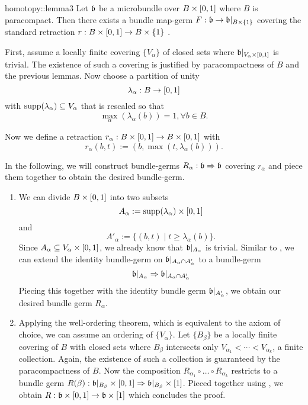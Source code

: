 \begin{scope}
\begin{mylemma}{homotopy::lemma3}
    Let $\bb$ be a microbundle over $B \times \I$ where $B$ is paracompact.
    Then there exists a bundle map-germ $F: \bb \to \bb\restr{B \times \{1\}}$
    covering the standard retraction $r: B \times \I \to B \times \{1\}$ .
\end{mylemma}
\begin{myproof}
    First, assume a locally finite covering $\{V_\alpha\}$ of closed sets where $\bb\restr{V_\alpha \times \I}$ is trivial.
    The existence of such a covering is justified by paracompactness of $B$ and the previous lemmas.
    Now choose a partition of unity
    \[ \lambda_\alpha: B \to \I \]
    with $\text{supp}(\lambda_\alpha) \sub V_\alpha$ that is rescaled so that
    \[ \max_{\alpha}(\lambda_\alpha(b)) = 1, \forall b \in B. \]
    
    Now we define a retraction $r_\alpha: B \times \I \to B \times \I$ with
    \[ r_\alpha(b, t) := (b, \max(t, \lambda_\alpha(b))). \]

    In the following, we will construct bundle-germs $R_\alpha: \bb \double \bb$ covering $r_\alpha$
    and piece them together to obtain the desired bundle-germ.
    \begin{enumerate}
        \item 
        We can divide $B \times \I$ into two subsets
        \[ A_\alpha := \text{supp}(\lambda_\alpha) \times \I \]
        and
        \[ A'_\alpha := \{(b, t) \mid t \ge \lambda_\alpha(b)\}. \]
        Since $A_\alpha \sub V_\alpha \times \I$, we already know that $\bb\restr{A_\alpha}$ is trivial.
        Similar to , we can extend the identity bundle-germ on $\bb\restr{\A \cap \A[']}$ to a bundle-germ
        \[ \bb\restr{\A} \double \bb\restr{\A \cap \A[']} \]
        Piecing this together with the identity bundle germ $\bb\restr{\A[']}$, we obtain our desired bundle germ $R_\alpha$.
        
        \item
        Applying the well-ordering theorem, which is equivalent to the axiom of choice, we can assume an ordering of $\{ V_\alpha \}$.
        Let $\{B_\beta\}$ be a locally finite covering of $B$ with closed sets where $B_\beta$ intersects only $V_{\alpha_1} < \cdots < V_{\alpha_k}$, a finite collection.
        Again, the existence of such a collection is guaranteed by the paracompactness of $B$. 
        Now the composition $R_{\alpha_1} \circ \ldots \circ R_{\alpha_k}$ restricts to a bundle germ $R(\beta): \bb\restr{B_\beta} \times \I \double \bb\restr{B_\beta} \times [1]$.
        Pieced together using , we obtain $R: \bb \times \I\to \bb \times [1]$ which concludes the proof.
    \end{enumerate}    
\end{myproof}


\end{scope}
